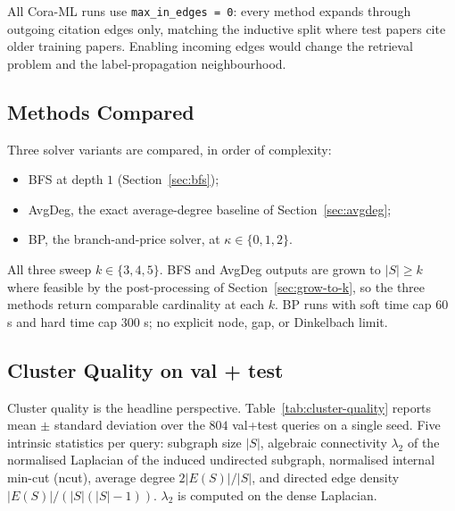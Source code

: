 \documentclass[11pt]{article}
\begin{document}
All Cora-ML runs use \texttt{max\_in\_edges = 0}: every method expands
through outgoing citation edges only, matching the inductive split where
test papers cite older training papers. Enabling incoming edges would
change the retrieval problem and the label-propagation neighbourhood.

\subsection{Methods Compared}
\label{sec:methods}

Three solver variants are compared, in order of complexity:
\begin{itemize}[leftmargin=1.1cm]
  \item BFS at depth $1$ (Section~\ref{sec:bfs});
  \item AvgDeg, the exact average-degree baseline of
  Section~\ref{sec:avgdeg};
  \item BP, the branch-and-price solver, at $\kappa \in \{0, 1, 2\}$.
\end{itemize}
All three sweep $k \in \{3, 4, 5\}$. BFS and AvgDeg outputs are grown to
$|S| \ge k$ where feasible by the post-processing of
Section~\ref{sec:grow-to-k}, so the three methods return comparable
cardinality at each $k$. BP runs with soft time cap $60$ s and hard time
cap $300$ s; no explicit node, gap, or Dinkelbach limit.

\subsection{Cluster Quality on val + test}
\label{sec:cluster}

Cluster quality is the headline perspective.
Table~\ref{tab:cluster-quality} reports mean $\pm$ standard deviation
over the $804$ val+test queries on a single seed. Five intrinsic
statistics per query: subgraph size $|S|$, algebraic connectivity
$\lambda_2$ of the normalised Laplacian of the induced undirected
subgraph, normalised internal min-cut (ncut), average degree
$2|E(S)|/|S|$, and directed edge density $|E(S)| / (|S|(|S|-1))$.
$\lambda_2$ is computed on the dense Laplacian.
\end{document}
